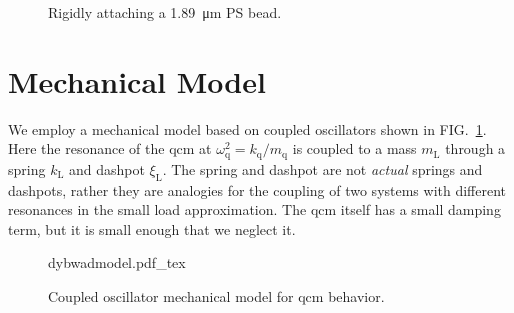 \documentclass[floatfix,superscriptaddress,a4paper,notitlepage]{revtex4-1}
\newcommand{\Figure}[1]{FIG.~\ref{#1}}
\newcommand{\df}{\Delta\!f}
\newcommand{\dg}{\Delta\Gamma}
\newcommand{\xil}{\xi_\mathrm{L}}
\newcommand{\kl}{k_\mathrm{L}}
\newcommand{\ml}{m_\mathrm{L}}
\newcommand{\kq}{k_\mathrm{q}}
\newcommand{\mq}{m_\mathrm{q}}
\newcommand{\omegaq}{\omega_\mathrm{q}}
\begin{document}
\begin{figure}[h]
  \centering
  \caption{Rigidly attaching a \SI{1.89}{\micro\meter} PS bead.}
\end{figure}

\section{Mechanical Model}
We employ a mechanical model based on coupled oscillators shown in
\Figure{fig:mechanicalmodel}.  Here the resonance of the \gls{qcm} at
$\omegaq^2=\kq/\mq$ is coupled to a mass $\ml$ through a spring $\kl$ and
dashpot $\xil$.  The spring and dashpot are not \textit{actual} springs and
dashpots, rather they are analogies for the coupling of two systems with
different resonances in the small load approximation.  The \gls{qcm} itself has a
small damping term, but it is small enough that we neglect it.
\begin{figure}[ht]
  \centering
  {dybwadmodel.pdf_tex}
  \caption{Coupled oscillator mechanical model for \gls{qcm} behavior.}
  \label{fig:mechanicalmodel}
\end{figure}
\end{document}
